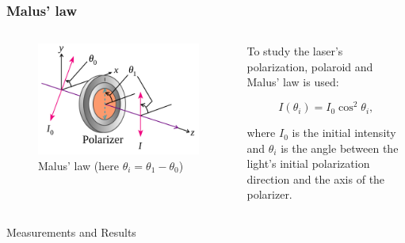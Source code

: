 \documentclass{beamer}
\begin{document}
\begin{frame}
	\frametitle{Malus' law}
	\begin{columns}
	\begin{column}{0.4\textwidth}
		\begin{figure}
			\centering
			\includegraphics[width=1\linewidth]{res/malus_law.png}
			\caption{Malus' law (here $\theta_i = \theta_1 - \theta_0$)}
		\end{figure}
	\end{column}
	\begin{column}{0.6\textwidth}
		 To study the laser's polarization, polaroid and Malus' law is used:
		 
		 $$I(\theta_i) = I_0 \cos^2{\theta_i},$$
		 
		 where $I_0$ is the initial intensity and $\theta_i$ is the angle between the light's initial polarization direction and the axis of the polarizer.
		 
	\end{column}
\end{columns}	


\end{frame}


\begin{frame}[plain,c]
	
	\begin{center}
		\huge {} Measurements and Results
	\end{center}
	
\end{frame}
\end{document}
